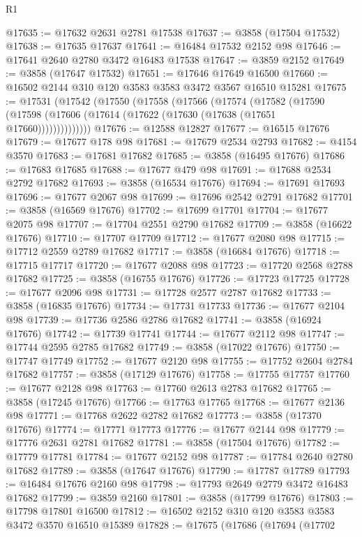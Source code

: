 \begin{lexlean}{R1}
\begin{coremodule}
@17635 := @17632 @2631 @2781 @17538
@17637 := @3858 (@17504 @17532)
@17638 := @17635 @17637
@17641 := @16484 @17532 @2152 @98
@17646 := @17641 @2640 @2780 @3472 @16483 @17538
@17647 := @3859 @2152
@17649 := @3858 (@17647 @17532)
@17651 := @17646 @17649 @16500
@17660 := @16502 @2144 @310 @120 @3583 @3583 @3472 @3567 @16510 @15281
@17675 := @17531
    (@17542
      (@17550
        (@17558
          (@17566
            (@17574
              (@17582
                (@17590 (@17598 (@17606 (@17614 (@17622 (@17630 (@17638 (@17651 @17660))))))))))))))
@17676 := @12588 @12827
@17677 := @16515 @17676
@17679 := @17677 @178 @98
@17681 := @17679 @2534 @2793
@17682 := @4154 @3570
@17683 := @17681 @17682
@17685 := @3858 (@16495 @17676)
@17686 := @17683 @17685
@17688 := @17677 @479 @98
@17691 := @17688 @2534 @2792 @17682
@17693 := @3858 (@16534 @17676)
@17694 := @17691 @17693
@17696 := @17677 @2067 @98
@17699 := @17696 @2542 @2791 @17682
@17701 := @3858 (@16569 @17676)
@17702 := @17699 @17701
@17704 := @17677 @2075 @98
@17707 := @17704 @2551 @2790 @17682
@17709 := @3858 (@16622 @17676)
@17710 := @17707 @17709
@17712 := @17677 @2080 @98
@17715 := @17712 @2559 @2789 @17682
@17717 := @3858 (@16684 @17676)
@17718 := @17715 @17717
@17720 := @17677 @2088 @98
@17723 := @17720 @2568 @2788 @17682
@17725 := @3858 (@16755 @17676)
@17726 := @17723 @17725
@17728 := @17677 @2096 @98
@17731 := @17728 @2577 @2787 @17682
@17733 := @3858 (@16835 @17676)
@17734 := @17731 @17733
@17736 := @17677 @2104 @98
@17739 := @17736 @2586 @2786 @17682
@17741 := @3858 (@16924 @17676)
@17742 := @17739 @17741
@17744 := @17677 @2112 @98
@17747 := @17744 @2595 @2785 @17682
@17749 := @3858 (@17022 @17676)
@17750 := @17747 @17749
@17752 := @17677 @2120 @98
@17755 := @17752 @2604 @2784 @17682
@17757 := @3858 (@17129 @17676)
@17758 := @17755 @17757
@17760 := @17677 @2128 @98
@17763 := @17760 @2613 @2783 @17682
@17765 := @3858 (@17245 @17676)
@17766 := @17763 @17765
@17768 := @17677 @2136 @98
@17771 := @17768 @2622 @2782 @17682
@17773 := @3858 (@17370 @17676)
@17774 := @17771 @17773
@17776 := @17677 @2144 @98
@17779 := @17776 @2631 @2781 @17682
@17781 := @3858 (@17504 @17676)
@17782 := @17779 @17781
@17784 := @17677 @2152 @98
@17787 := @17784 @2640 @2780 @17682
@17789 := @3858 (@17647 @17676)
@17790 := @17787 @17789
@17793 := @16484 @17676 @2160 @98
@17798 := @17793 @2649 @2779 @3472 @16483 @17682
@17799 := @3859 @2160
@17801 := @3858 (@17799 @17676)
@17803 := @17798 @17801 @16500
@17812 := @16502 @2152 @310 @120 @3583 @3583 @3472 @3570 @16510 @15389
@17828 := @17675
    (@17686
      (@17694
        (@17702

\end{coremodule}
\end{lexlean}
